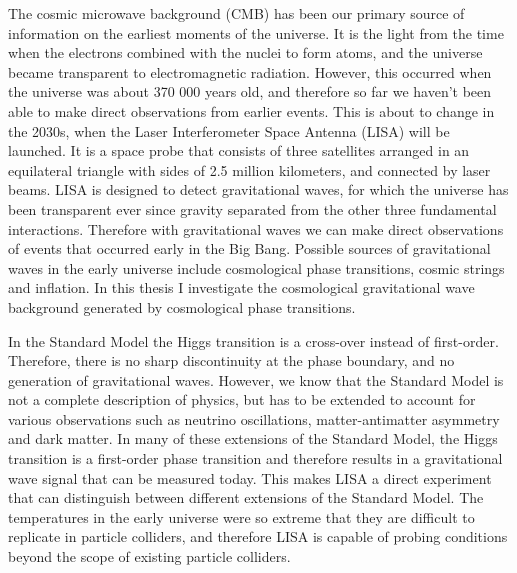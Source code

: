 The cosmic microwave background (CMB) has been our primary source of information on the earliest moments of the universe.
It is the light from the time when the electrons combined with the nuclei to form atoms,
and the universe became transparent to electromagnetic radiation.
However, this occurred when the universe was about 370 000 years old,
and therefore so far we haven't been able to make direct observations from earlier events.
This is about to change in the 2030s, when the Laser Interferometer Space Antenna (LISA) will be launched.
It is a space probe that consists of three satellites arranged in an equilateral triangle with sides of 2.5 million kilometers,
and connected by laser beams.
LISA is designed to detect gravitational waves,
for which the universe has been transparent ever since gravity separated from the other three fundamental interactions.
Therefore with gravitational waves we can make direct observations of events that occurred early in the Big Bang.
Possible sources of gravitational waves in the early universe include cosmological phase transitions, cosmic strings and inflation.
In this thesis I investigate the cosmological gravitational wave background generated by cosmological phase transitions.
\cites{lecture_notes}{lisa_2017}

In the Standard Model the Higgs transition is a cross-over instead of first-order.
Therefore, there is no sharp discontinuity at the phase boundary, and no generation of gravitational waves.
However, we know that the Standard Model is not a complete description of physics,
but has to be extended to account for various observations such as neutrino oscillations, matter-antimatter asymmetry and dark matter.
In many of these extensions of the Standard Model, the Higgs transition is a first-order phase transition
and therefore results in a gravitational wave signal that can be measured today.
This makes LISA a direct experiment that can distinguish between different extensions of the Standard Model.
The temperatures in the early universe were so extreme that they are difficult to replicate in particle colliders,
and therefore LISA is capable of probing conditions beyond the scope of existing particle colliders.
\cites{lecture_notes}{kajantie_is_1996}{caprini_detecting_2020}

